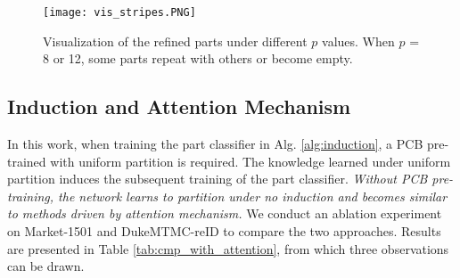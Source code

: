 \documentclass[10pt,twocolumn,letterpaper]{article}
\begin{document}
\begin{figure}[t]

\begin{center}
\texttt{[image: vis\_stripes.PNG]}
\end{center}
   \caption{Visualization of the refined parts under different $p$ values. When $p$ = 8 or 12, some parts repeat with others or become empty.}
\label{fig:vis_stripes}
\end{figure}



\subsection{Induction and Attention Mechanism}\label{sec:cmp_attention}
In this work, when training the part classifier in Alg. \ref{alg:induction}, a PCB pre-trained with uniform partition is required. The knowledge learned under uniform partition induces the subsequent training of the part classifier. \emph{Without PCB pre-training, the network learns to partition  under no induction and becomes similar to methods driven by attention mechanism.} We conduct an ablation experiment on Market-1501 and DukeMTMC-reID to compare the two approaches. Results are presented in Table \ref{tab:cmp_with_attention}, from which three observations can be drawn.
\end{document}
